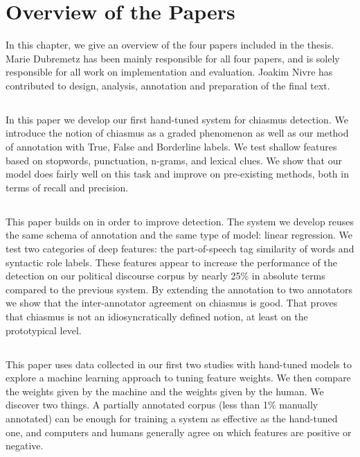 \chapter{Overview of the Papers}
In this chapter, we give an overview of the four papers included in the thesis. Marie Dubremetz has been mainly responsible for all four papers, and is solely responsible for all work on implementation and evaluation. Joakim Nivre has contributed to design, analysis, annotation and preparation of the final text.
\section*{}
In this paper we develop our first hand-tuned system for chiasmus detection. We introduce the notion of chiasmus as a graded phenomenon as well as our method of annotation with True, False and Borderline labels. We test shallow features based on stopwords, punctuation, n-grams, and lexical clues. We show that our model does fairly well on this task and improve on pre-existing methods, both in terms of recall and precision.

\section*{} 
This paper builds on  in order to improve detection. The system we develop reuses the same schema of annotation and the same type of model: linear regression. We test two categories of deep features: the part-of-speech tag similarity of words and syntactic role labels. These features appear to increase the performance of the detection on our political discourse corpus by nearly 25\% in absolute terms compared to the previous system. By extending the annotation to two annotators  we show that the inter-annotator agreement on chiasmus is good. That  proves that chiasmus is not an idiosyncratically defined notion, at least on the prototypical level. %


\section*{}
This paper uses data collected in our first two studies with hand-tuned models to explore a machine learning approach to tuning feature weights. We then compare the weights given by the machine and the weights given by the human. We discover two things. A partially annotated corpus (less than 1\% manually annotated) can be enough for training a system as effective as the hand-tuned one, and computers and humans generally agree on which features are positive or negative.

